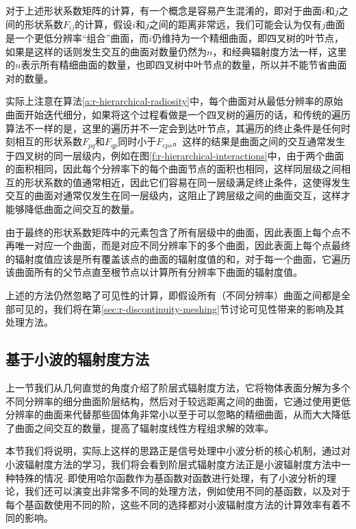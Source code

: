 对于上述形状系数矩阵的计算，有一个概念是容易产生混淆的，即对于曲面$i$和$j$之间的形状系数$F_{ij}$的计算，假设$i$和$j$之间的距离非常远，我们可能会认为仅有$j$曲面是一个更低分辨率“组合”曲面，而$i$仍维持为一个精细曲面，即四叉树的叶节点，如果是这样的话则发生交互的曲面对数量仍然为$n$，和经典辐射度方法一样，这里的$n$表示所有精细曲面的数量，也即四叉树中叶节点的数量，所以并不能节省曲面对的数量。

实际上注意在算法\ref{a:r-hierarchical-radiosity}中，每个曲面对从最低分辨率的原始曲面开始迭代细分，如果将这个过程看做是一个四叉树的遍历的话，和传统的遍历算法不一样的是，这里的遍历并不一定会到达叶节点，其遍历的终止条件是任何时刻相互的形状系数$F_{pq}$和$F_{qp}$同时小于$F_{eps}$。这样的结果是曲面之间的交互通常发生于四叉树的同一层级内，例如在图\ref{f:r-hierarchical-interactions}中，由于两个曲面的面积相同，因此每个分辨率下的每个曲面节点的面积也相同，这样同层级之间相互的形状系数的值通常相近，因此它们容易在同一层级满足终止条件，这使得发生交互的曲面对通常仅发生在同一层级内，这阻止了跨层级之间的曲面交互，这样才能够降低曲面之间交互的数量。

由于最终的形状系数矩阵中的元素包含了所有层级中的曲面，因此表面上每个点不再唯一对应一个曲面，而是对应不同分辨率下的多个曲面，因此表面上每个点最终的辐射度值应该是所有覆盖该点的曲面的辐射度值的和，对于每一个曲面，它遍历该曲面所有的父节点直至根节点以计算所有分辨率下曲面的辐射度值。

上述的方法仍然忽略了可见性的计算，即假设所有（不同分辨率）曲面之间都是全部可见的，我们将在第\ref{sec:r-discontinuity-meshing}节讨论可见性带来的影响及其处理方法。





\subsection{基于小波的辐射度方法}\label{sec:r-wavelet-based}
上一节我们从几何直觉的角度介绍了阶层式辐射度方法，它将物体表面分解为多个不同分辨率的细分曲面阶层结构，然后对于较远距离之间的曲面，它通过使用更低分辨率的曲面来代替那些固体角非常小以至于可以忽略的精细曲面，从而大大降低了曲面之间交互的数量，提高了辐射度线性方程组求解的效率。

本节我们将说明，实际上这样的思路正是信号处理中小波分析的核心机制，通过对小波辐射度方法的学习，我们将会看到阶层式辐射度方法正是小波辐射度方法中一种特殊的情况--即使用哈尔函数作为基函数对函数进行处理，有了小波分析的理论，我们还可以演变出非常多不同的处理方法，例如使用不同的基函数，以及对于每个基函数使用不同的阶，这些不同的选择都对小波辐射度方法的计算效率有着不同的影响。

